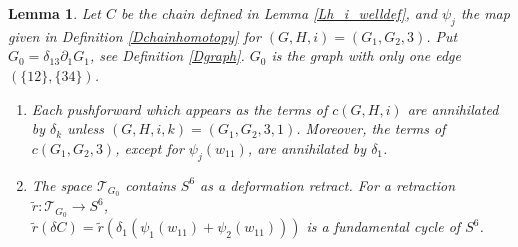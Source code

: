 \documentclass[reqno]{amsart}
\theoremstyle{definition}
\theoremstyle{plain}
\newtheorem{lem}[defi]{Lemma}
\newcommand{\TT}{\mathcal{T}} %
\begin{document}
\begin{lem}\label{Lfundcyc} Let $C$ be the chain defined in Lemma \ref{Lh_i_welldef}, and    $\psi_j$ the map given in Definition \ref{Dchainhomotopy} for $(G,H,i)=(G_1, G_2,3)$.  Put $G_0=\delta_{13}\partial_1G_1$, see Definition \ref{Dgraph}. $G_0$ is the graph with only one edge $(\{12\},\{34\})$. 
\begin{enumerate}
\item Each pushforward which appears as  the terms of $c(G,H,i)$ are annihilated by $\delta_k$ unless $(G,H,i,k)=(G_1,G_2,3,1)$. Moreover, 
the terms of $c(G_1,G_2,3)$, except for $\psi_j(w_{11})$, are annihilated by $\delta_1$.

\item  The space $\TT_{G_0}$ contains $S^6$ as a deformation retract. For a retraction $\tilde r:\TT_{G_0}\to S^6$,\\
$\tilde r(\delta C)=\tilde r(\delta_1(\psi_1(w_{11})+\psi_2(w_{11})))$ is a fundamental cycle of $S^6$.
\end{enumerate}
\end{lem}
\end{document}
